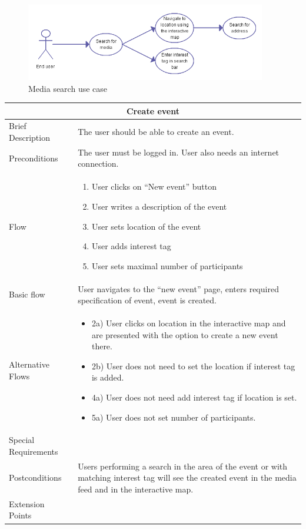 \begin{figure}[ht!]
\centering
\includegraphics[width=105mm]{./SystemRequirements/img/searchUC.png}
\caption{Media search use case \label{fig:SysReqUseCasesSearch}}
\end{figure}

\begin{minipage}{\linewidth}
\begin{tabular}{|l|p{85mm}|}
  \hline
  \multicolumn{2}{|c|}{\cellcolor{gray!25} \textbf{Create event}} \\
  \hline
  Brief Description & The user should be able to create an event.\\
  Preconditions & The user must be logged in. User also needs an internet connection.\\
  Flow &
    \begin{enumerate}
      \item User clicks on “New event” button
      \item User writes a description of the event
      \item User sets location of the event
      \item User adds interest tag
      \item User sets maximal number of participants
    \end{enumerate} \\
  Basic flow & User navigates to the “new event” page, enters required specification of event, event is created.\\
  Alternative Flows & 
    \begin{itemize}
      \item 2a) User clicks on location in the interactive map and are presented with the option to create a new event there.
      \item 2b) User does not need to set the location if interest tag is added.
      \item 4a) User does not need add interest tag if location is set.
      \item 5a) User does not set number of participants.
    \end{itemize} \\
  Special Requirements & \\
  Postconditions & Users performing a search in the area of the event or with matching interest tag will see the created event in the media feed and in the interactive map.\\
  Extension Points & \\
  \hline
\end{tabular}
\end{minipage}

